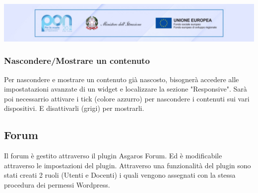 \documentclass{article}
\begin{document}
	\vspace{0.2 cm}
	\includegraphics[scale=0.2]{PON.jpeg}

	\subsubsection{\textbf{Nascondere/Mostrare un contenuto}}
	Per nascondere e mostrare un contenuto già nascosto, bisognerà accedere alle impostatazioni avanzate di un widget e localizzare la sezione "Responsive".
	Sarà poi necessarrio attivare i tick (colore azzurro) per nascondere i contenuti sui vari dispositivi. E disattivarli (grigi) per mostrarli.

	\subsection{\textbf{Forum}}
	Il forum è gestito attraverso il plugin Asgaros Forum. Ed è modificabile attraverso le impostazioni del plugin.
	Attraverso una funzionalità del plugin sono stati creati 2 ruoli (Utenti e Docenti) i quali vengono assegnati con la stessa procedura dei permessi Wordpress.
\pagebreak
\end{document}

